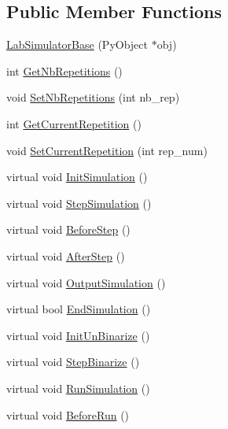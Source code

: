 \subsection*{Public Member Functions}
\begin{DoxyCompactItemize}
\item 
\hyperlink{classelps_1_1_lab_simulator_base_ac824c00df09c78d0ab3d447340195643}{Lab\+Simulator\+Base} (Py\+Object $\ast$obj)
\item 
int \hyperlink{classelps_1_1_lab_simulator_base_a92317bd9b947016f1652a4ceb01905ad}{Get\+Nb\+Repetitions} ()
\item 
void \hyperlink{classelps_1_1_lab_simulator_base_a8088b2d51c5c07d190e3a87d2995bb63}{Set\+Nb\+Repetitions} (int nb\+\_\+rep)
\item 
int \hyperlink{classelps_1_1_lab_simulator_base_af5b61f2481886d12afa0fbca879ca24e}{Get\+Current\+Repetition} ()
\item 
void \hyperlink{classelps_1_1_lab_simulator_base_a379cb60ca4c4c7fb6a60aa4d3dc617d6}{Set\+Current\+Repetition} (int rep\+\_\+num)
\item 
virtual void \hyperlink{classelps_1_1_lab_simulator_base_aa14aa05df8173ffd2a2e67aa25f3cea5}{Init\+Simulation} ()
\item 
virtual void \hyperlink{classelps_1_1_lab_simulator_base_ab48b05171894c3405e6865e019774106}{Step\+Simulation} ()
\item 
virtual void \hyperlink{classelps_1_1_lab_simulator_base_a51232753515304871678d22aea555a8b}{Before\+Step} ()
\item 
virtual void \hyperlink{classelps_1_1_lab_simulator_base_ad00284fc35dec38e6933a37858cb72c6}{After\+Step} ()
\item 
virtual void \hyperlink{classelps_1_1_lab_simulator_base_ac0c49279bf16f19b4f8fbd856e3fc6d6}{Output\+Simulation} ()
\item 
virtual bool \hyperlink{classelps_1_1_lab_simulator_base_ae54d693898ca10e20bb9e7e22264bab8}{End\+Simulation} ()
\item 
virtual void \hyperlink{classelps_1_1_lab_simulator_base_a1339bc2fd37e7a4cc5c8792f447bf348}{Init\+Un\+Binarize} ()
\item 
virtual void \hyperlink{classelps_1_1_lab_simulator_base_ac1dcb0ae906c0e729a31172a02c243e2}{Step\+Binarize} ()
\item 
virtual void \hyperlink{classelps_1_1_lab_simulator_base_ab48e943c2b85b25ff96b2aab4d9aa4bd}{Run\+Simulation} ()
\item 
virtual void \hyperlink{classelps_1_1_lab_simulator_base_abf0012f53b199184d9359656f2f9e4e1}{Before\+Run} ()

\end{DoxyCompactItemize}

